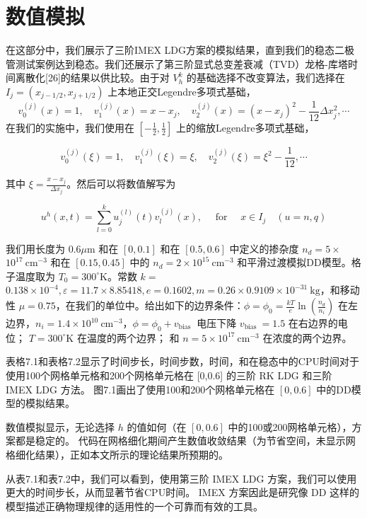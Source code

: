 \section{数值模拟}
在这部分中，我们展示了三阶IMEX LDG方案的模拟结果，直到我们的稳态二极管测试案例达到稳态。我们还展示了第三阶显式总变差衰减（TVD）龙格-库塔时间离散化[26]的结果以供比较。由于对 $V_{h}^{k}$ 的基础选择不改变算法，我们选择在 $I_{j}=\left(x_{j-1 / 2}, x_{j+1 / 2}\right)$ 上本地正交Legendre多项式基础，
$$
    v_{0}^{(j)}(x)=1, \quad v_{1}^{(j)}(x)=x-x_{j}, \quad v_{2}^{(j)}(x)=\left(x-x_{j}\right)^{2}-\frac{1}{12} \Delta x_{j}^{2}, \cdots
$$
在我们的实施中，我们使用在 $\left[-\frac{1}{2}, \frac{1}{2}\right]$ 上的缩放Legendre多项式基础，

$$
    v_{0}^{(j)}(\xi)=1, \quad v_{1}^{(j)}(\xi)=\xi, \quad v_{2}^{(j)}(\xi)=\xi^{2}-\frac{1}{12}, \cdots
$$

其中 $\xi=\frac{x-x_{j}}{\Delta x_{j}}$。然后可以将数值解写为

$$
    u^{h}(x, t)=\sum_{l=0}^{k} u_{j}^{(l)}(t) v_{l}^{(j)}(x), \quad \text { for } \quad x \in I_{j} \quad(u=n, q)
$$

我们用长度为 $0.6 \mu \mathrm{m}$ 和在 $[0,0.1]$ 和在 $[0.5,0.6]$ 中定义的掺杂度 $n_{d}=5 \times$ $10^{17} \mathrm{~cm}^{-3}$ 和在 $[0.15,0.45]$ 中的 $n_{d}=2 \times 10^{15} \mathrm{~cm}^{-3}$ 和平滑过渡模拟DD模型。格子温度取为 $T_{0}=300^{\circ} \mathrm{K}$。常数 $k=$ $0.138 \times 10^{-4}, \varepsilon=11.7 \times 8.85418, e=0.1602, m=0.26 \times 0.9109 \times 10^{-31} \mathrm{~kg}$，和移动性 $\mu=0.75$，在我们的单位中。给出如下的边界条件：$\phi=\phi_{0}=\frac{k T}{e} \ln \left(\frac{n_{d}}{n_{i}}\right)$ 在左边界，$n_{i}=1.4 \times 10^{10} \mathrm{~cm}^{-3}$，$\phi=\phi_{0}+v_{\text {bias }}$ 电压下降 $v_{\text {bias }}=1.5$ 在右边界的电位； $T=300^{\circ} \mathrm{K}$ 在温度的两个边界； 和 $n=5 \times 10^{17} \mathrm{~cm}^{-3}$ 在浓度的两个边界。

表格7.1和表格7.2显示了时间步长，时间步数，时间，和在稳态中的CPU时间对于使用100个网格单元格和200个网格单元格在 [0,0.6] 的三阶 RK LDG 和三阶 IMEX LDG 方法。 图7.1画出了使用100和200个网格单元格在 $[0,0.6]$ 中的DD模型的模拟结果。

数值模拟显示，无论选择 $h$ 的值如何（在 $[0,0.6]$ 中的100或200网格单元格），方案都是稳定的。 代码在网格细化期间产生数值收敛结果（为节省空间，未显示网格细化结果），正如本文所示的理论结果所预期的。

从表7.1和表7.2中，我们可以看到，使用第三阶 IMEX LDG 方案，我们可以使用更大的时间步长，从而显著节省CPU时间。 IMEX 方案因此是研究像 DD 这样的模型描述正确物理规律的适用性的一个可靠而有效的工具。

